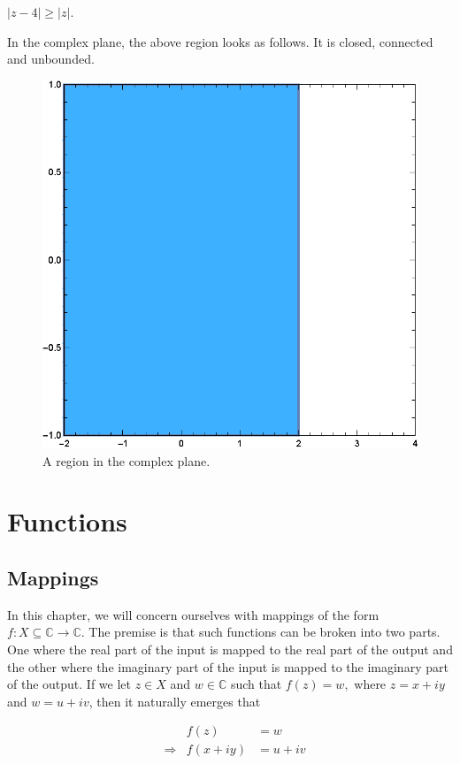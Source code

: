 \documentclass[12pt]{book}
\begin{document}
\begin{exmp}
    $|z - 4| \geq |z|.$
\end{exmp}
In the complex plane, the above region looks as follows. It is closed, connected and unbounded.
\begin{figure}[H]
    \centering
    \includegraphics[scale = 0.7]{./figs/chapter_1/region_plot_4.eps}
    \caption{A region in the complex plane.}
\end{figure}

\chapter{Functions}
\section{Mappings}
In this chapter, we will concern ourselves with mappings of the form $f: X \subseteq \mathbb{C} \rightarrow \mathbb{C}.$ The premise is that such functions can be broken into two parts. One where the real part of the input is mapped to the real part of the output and the other where the imaginary part of the input is mapped to the imaginary part of the output. If we let $z \in X$ and  $w \in \mathbb{C}$ such that $f(z) = w,$ where $z = x + iy$ and $w = u + iv$, then it naturally emerges that

\begin{align*}
    &&f(z) 
        &= w \\
    &\Rightarrow &f(x + iy) 
        &= u + iv \\
\end{align*}
\end{document}
